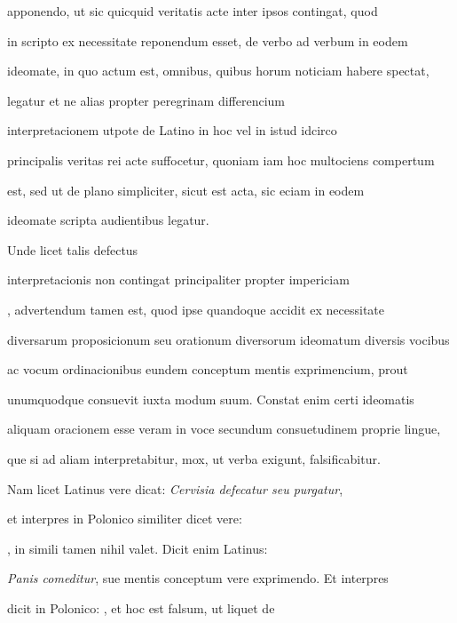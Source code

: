 apponendo, ut sic quicquid veritatis acte inter ipsos contingat, quod

in scripto ex necessitate reponendum esset, de verbo ad verbum in eodem

ideomate, in quo actum est, omnibus, quibus horum noticiam habere spectat,

 legatur et ne alias propter peregrinam differencium 

 interpretacionem utpote de Latino in hoc vel in istud idcirco

principalis veritas rei acte suffocetur, quoniam iam hoc multociens compertum

est, sed ut de plano simpliciter, sicut est acta, sic eciam in eodem

\splitlines{}

ideomate scripta audientibus legatur.

\indentK Unde licet talis defectus

\fulllines{}

interpretacionis non contingat principaliter propter impericiam 

, advertendum tamen est, quod ipse quandoque accidit ex necessitate

diversarum proposicionum seu orationum diversorum ideomatum diversis vocibus

ac vocum ordinacionibus eundem conceptum mentis exprimencium, prout

unumquodque consuevit iuxta modum suum. Constat enim certi ideomatis

aliquam oracionem esse veram in voce secundum consuetudinem proprie lingue,

que si ad aliam interpretabitur, mox, ut verba exigunt, falsificabitur.

\indentK Nam licet Latinus vere dicat: \textit{Cervisia defecatur seu purgatur},

et interpres in Polonico similiter dicet vere:   

   , in simili tamen nihil valet. Dicit enim Latinus:

\textit{Panis comeditur}, sue mentis conceptum vere exprimendo. Et interpres

dicit in Polonico:   , et hoc est falsum, ut liquet de

\splitlines{}

